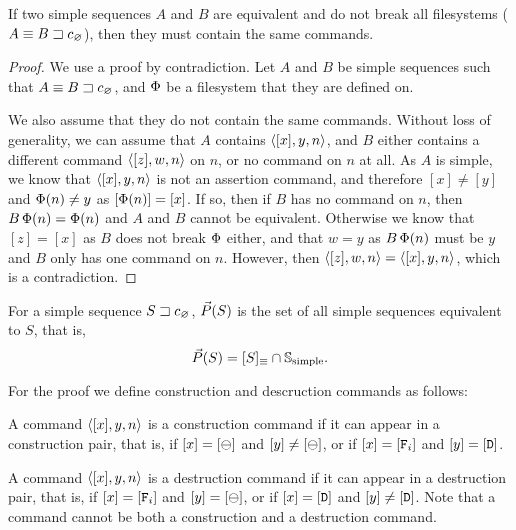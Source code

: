 
\begin{mylem}
If two simple sequences $A$ and $B$ are equivalent
and do not break all filesystems ($A\equiv {B}\sqsupset c_\varnothing$),
then they must contain the same commands.
\end{mylem}
\begin{proof}
We use a proof by contradiction. Let $A$ and $B$ be simple sequences
such that $A\equiv {B}\sqsupset c_\varnothing$,
and $\Phi$ be a filesystem that they are defined on.

We also assume that they do not contain the same commands.
Without loss of generality, we can assume
that $A$
contains $\langle{[x],y,n}\rangle$, and $B$ either contains a different command
$\langle{[z],w,n}\rangle$ on $n$, or no command on $n$ at all.
As $A$ is simple, we know that $\langle{[x],y,n}\rangle$ is not an assertion command,
and therefore $[x]\neq [y]$ and $\Phi(n)\neq y$ as $[\Phi(n)]=[x]$.
If so, then if $B$ has no command on $n$, then $B\,\Phi(n)=\Phi(n)$ and
$A$ and $B$ cannot be equivalent.
Otherwise we know that $[z]=[x]$ as $B$ does not break $\Phi$ either,
and that $w=y$ as $B\,\Phi(n)$ must
be $y$ and $B$ only has one command on $n$.
However, then $\langle{[z],w,n}\rangle=\langle{[x],y,n}\rangle$, which is a contradiction.
\end{proof}



\begin{mylem}
For a simple sequence ${S}\sqsupset c_\varnothing$,
$\vec{P}({S})$ is the set of all simple sequences equivalent to $S$, that is,
\[ \vec{P}({S}) = [S]_\equiv \cap \mathbb{S}_{\mathrm{simple}}. \]
\end{mylem}

For the proof we define construction and descruction commands as follows:
\begin{mydef}
A command $\langle{[x],y,n}\rangle$ is a construction command if it can appear in a construction pair,
that is, if $[x]=[\ominus]$ and $[y]\neq[\ominus]$,
or if $[x]=[\mathtt{F}_i]$ and $[y]=[\mathtt{D}]$.
\end{mydef}
\begin{mydef}
A command $\langle{[x],y,n}\rangle$ is a destruction command if it can appear in a destruction pair,
that is, 
if $[x]=[\mathtt{F}_i]$ and $[y]=[\ominus]$,
or if $[x]=[\mathtt{D}]$ and $[y]\neq[\mathtt{D}]$.
Note that a command cannot be both a construction and a destruction command.
\end{mydef}


